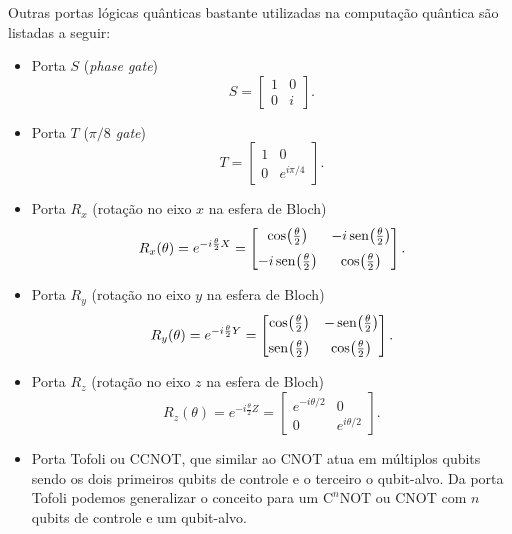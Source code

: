 Outras portas lógicas quânticas bastante utilizadas na computação quântica são listadas a seguir:

\begin{itemize}
    \item Porta $S$ (\textit{phase gate})
        \begin{equation}\label{eq:ps}
        S = \begin{bmatrix}
            1 & 0 \\
            0 & i
        \end{bmatrix}.
        \end{equation}
    \item Porta $T$ (\textit{$\pi/8$ gate})
        \begin{equation}\label{eq:pt}
        T = \begin{bmatrix}
            1 & 0 \\
            0 & e^{i\pi/4}
        \end{bmatrix}.
        \end{equation}
    \item Porta $R_x$ (rotação no eixo $x$ na esfera de Bloch)
        \begin{equation}\label{eq:rx}
        R_x(\theta) = e^{-i\frac{\theta}{2}X}=\begin{bmatrix}
        \cos\!\left(\frac{\theta}{2}\right)
        &
        -i\operatorname{sen}\!\left(\frac{\theta}{2}\right)
        \\[6pt]
        -i\operatorname{sen}\!\left(\frac{\theta}{2}\right)
        &
        \cos\!\left(\frac{\theta}{2}\right)
        \end{bmatrix}.
        \end{equation}
    \item Porta $R_y$ (rotação no eixo $y$ na esfera de Bloch)
        \begin{equation}
        R_y(\theta) = e^{-i\frac{\theta}{2}Y}
        =
        \begin{bmatrix}
        \cos\!\left(\frac{\theta}{2}\right)
        &
        -\operatorname{sen}\!\left(\frac{\theta}{2}\right)
        \\[6pt]
        \operatorname{sen}\!\left(\frac{\theta}{2}\right)
        &
        \cos\!\left(\frac{\theta}{2}\right)
        \end{bmatrix}.
        \end{equation}
    \item Porta $R_z$ (rotação no eixo $z$ na esfera de Bloch)
        \begin{equation}
        R_z(\theta) = e^{-i\frac{\theta}{2}Z}
        =
        \begin{bmatrix}
        e^{-i\theta/2} & 0 \\
        0 & e^{i\theta/2}
        \end{bmatrix}.
        \end{equation}
    \item Porta Tofoli ou \textsf{CCNOT}, que similar ao \textsf{CNOT} atua em múltiplos qubits sendo os dois primeiros qubits de controle e o terceiro o qubit-alvo. Da porta Tofoli podemos generalizar o conceito para um $\text{C}^n\text{NOT}$ ou \textsf{CNOT} com $n$ qubits de controle e um qubit-alvo.
\end{itemize}

